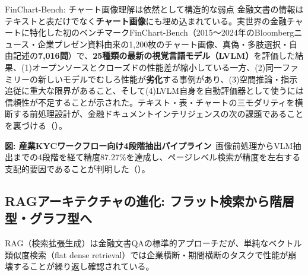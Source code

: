\begin{casestudy}{FinChart-Bench: チャート画像理解は依然として構造的な弱点}
金融文書の情報はテキストと表だけでなく\textbf{チャート画像}にも埋め込まれている。実世界の金融チャートに特化した初のベンチマークFinChart-Bench（2015〜2024年のBloombergニュース・企業プレゼン資料由来の1,200枚のチャート画像、真偽・多肢選択・自由記述の\textbf{7,016問}）で、\textbf{25種類の最新の視覚言語モデル（LVLM）}を評価した結果、(1)オープンソースとクローズドの性能差が縮小している一方、(2)同一ファミリーの新しいモデルでむしろ性能が\textbf{劣化}する事例があり、(3)空間推論・指示追従に重大な限界があること、そして(4)LVLM自身を自動評価器として使うには信頼性が不足することが示された。テキスト・表・チャートの三モダリティを横断する前処理設計が、金融ドキュメントインテリジェンスの次の課題であることを裏づける（\cite{x02finchartbench2025}）。
\end{casestudy}

\begin{center}
\end{center}

{\small\color{brandgray}\textbf{図: 産業KYCワークフロー向け4段階抽出パイプライン}\ 画像前処理からVLM抽出までの4段階を経て精度87.27\%を達成し、ページレベル検索が精度を左右する支配的要因であることが判明した（\cite{multistageextraction2026}）。}

\subsection{RAGアーキテクチャの進化: フラット検索から階層型・グラフ型へ}

RAG（検索拡張生成）は金融文書QAの標準的アプローチだが、単純なベクトル類似度検索（flat dense retrieval）では企業横断・期間横断のタスクで性能が崩壊することが繰り返し確認されている。

